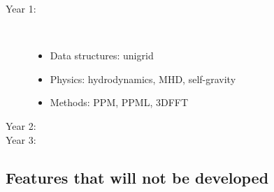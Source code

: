 \documentclass[11pt]{article}
\begin{document}

\begin{description}
\item[Year 1: ]\
\begin{itemize}
\item Data structures: unigrid
\item Physics: hydrodynamics, MHD, self-gravity
\item Methods: PPM, PPML, 3DFFT
\end{itemize}

\item[Year 2: ] 

\item[Year 3: ]
\end{description}
\subsection{Features that will not be developed}


\end{document}
